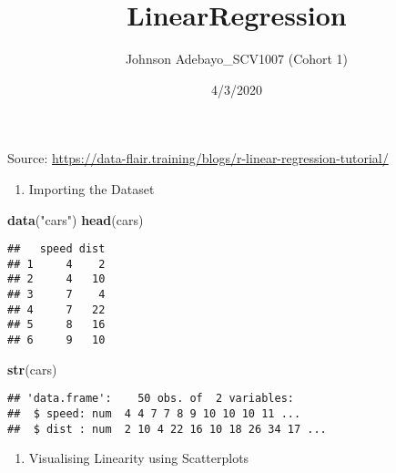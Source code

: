 \documentclass[
]{article}
\title{LinearRegression}
\author{Johnson Adebayo\_SCV1007 (Cohort 1)}
\date{4/3/2020}
\newenvironment{Shaded}{\begin{snugshade}}{\end{snugshade}}
\newcommand{\DataTypeTok}[1]{\textcolor[rgb]{0.13,0.29,0.53}{#1}}
\newcommand{\KeywordTok}[1]{\textcolor[rgb]{0.13,0.29,0.53}{\textbf{#1}}}
\newcommand{\NormalTok}[1]{#1}
\newcommand{\OperatorTok}[1]{\textcolor[rgb]{0.81,0.36,0.00}{\textbf{#1}}}
\newcommand{\StringTok}[1]{\textcolor[rgb]{0.31,0.60,0.02}{#1}}
\providecommand{\tightlist}{%
  \setlength{\itemsep}{0pt}\setlength{\parskip}{0pt}}
\begin{document}
\maketitle

Source:
\url{https://data-flair.training/blogs/r-linear-regression-tutorial/}

\begin{enumerate}
\def\labelenumi{\arabic{enumi}.}
\tightlist
\item
  Importing the Dataset
\end{enumerate}

\begin{Shaded}
\begin{Highlighting}[]
\KeywordTok{data}\NormalTok{(}\StringTok{"cars"}\NormalTok{)}
\KeywordTok{head}\NormalTok{(cars)}
\end{Highlighting}
\end{Shaded}

\begin{verbatim}
##   speed dist
## 1     4    2
## 2     4   10
## 3     7    4
## 4     7   22
## 5     8   16
## 6     9   10
\end{verbatim}

\begin{Shaded}
\begin{Highlighting}[]
\KeywordTok{str}\NormalTok{(cars)}
\end{Highlighting}
\end{Shaded}

\begin{verbatim}
## 'data.frame':    50 obs. of  2 variables:
##  $ speed: num  4 4 7 7 8 9 10 10 10 11 ...
##  $ dist : num  2 10 4 22 16 10 18 26 34 17 ...
\end{verbatim}

\begin{enumerate}
\def\labelenumi{\arabic{enumi}.}
\setcounter{enumi}{1}
\tightlist
\item
  Visualising Linearity using Scatterplots
\end{enumerate}

\begin{Shaded}
\end{Shaded}
\end{document}
